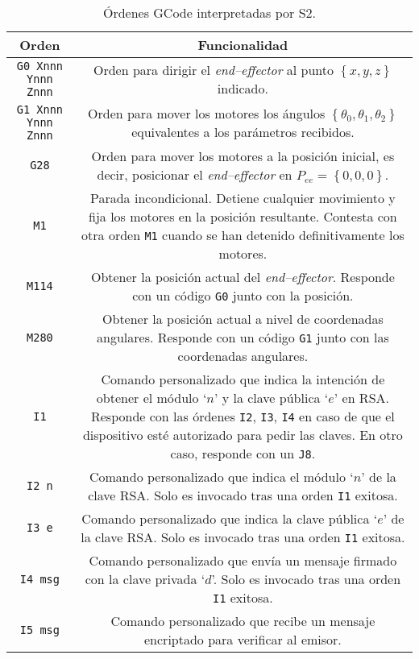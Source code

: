 \begin{longtable}{| C{0.5} | C{1} |}
    \caption{Órdenes GCode interpretadas por \ac{S2}.}
    \label{tab:gcode_def}
    \endfirsthead
    \endhead
    \hline
    \textbf{Orden} & \textbf{Funcionalidad} \\
    \hline
    \texttt{G0 Xnnn Ynnn Znnn} & Orden para dirigir el \textit{end--effector} al punto $\left\{x, y, z\right\}$ indicado. \\
    \hline
    \texttt{G1 Xnnn Ynnn Znnn} & Orden para mover los motores los ángulos $\left\{\theta_0, \theta_1, \theta_2\right\}$ equivalentes a los parámetros recibidos. \\
    \hline
    \texttt{G28} & Orden para mover los motores a la posición inicial, es decir, posicionar el \textit{end--effector} en $P_{ee} = \left\{0, 0, 0\right\}$. \\
    \hline
    \texttt{M1} & Parada incondicional. Detiene cualquier movimiento y fija los motores en la posición resultante. Contesta con otra orden \texttt{M1} cuando se han detenido definitivamente los motores. \\
    \hline
    \texttt{M114} & Obtener la posición actual del \textit{end--effector}. Responde con un código \texttt{G0} junto con la posición. \\
    \hline
    \texttt{M280} & Obtener la posición actual a nivel de coordenadas angulares. Responde con un código \texttt{G1} junto con las coordenadas angulares. \\
    \hline
    \texttt{I1} & Comando personalizado que indica la intención de obtener el módulo `$n$' y la clave pública `$e$' en RSA. Responde con las órdenes \texttt{I2}, \texttt{I3}, \texttt{I4} en caso de que el dispositivo esté autorizado para pedir las claves. En otro caso, responde con un \texttt{J8}. \\
    \hline
    \texttt{I2 n} & Comando personalizado que indica el módulo `$n$' de la clave RSA. Solo es invocado tras una orden \texttt{I1} exitosa. \\
    \hline
    \texttt{I3 e} & Comando personalizado que indica la clave pública `$e$' de la clave RSA. Solo es invocado tras una orden \texttt{I1} exitosa. \\
    \hline
    \texttt{I4 msg} & Comando personalizado que envía un mensaje firmado con la clave privada `$d$'. Solo es invocado tras una orden \texttt{I1} exitosa. \\
    \hline
    \texttt{I5 msg} & Comando personalizado que recibe un mensaje encriptado para verificar al emisor. \\

\end{longtable}
